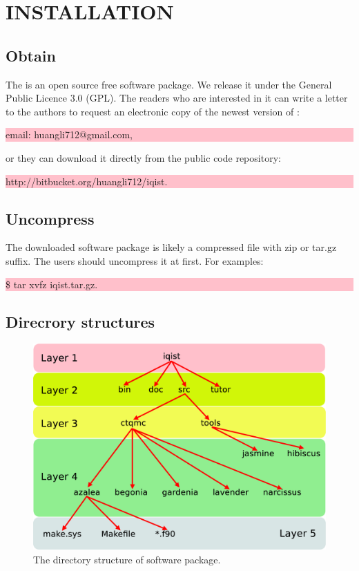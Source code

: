 \chapter{INSTALLATION}
\section{Obtain}

The {\iqist} is an open source free software package. We release it under the General Public Licence 3.0 (GPL). The readers who are interested in it can write a letter to the authors to request an electronic copy of the newest version of {\iqist}:
 
\noindent\colorbox{pink}{\parbox[r]{\linewidth}{\quad email: huangli712@gmail.com,}}
or they can download it directly from the public code repository:

\noindent\colorbox{pink}{\parbox[r]{\linewidth}{\quad http://bitbucket.org/huangli712/iqist.}}

\section{Uncompress}

The downloaded {\iqist} software package is likely a compressed file with zip or tar.gz suffix. The users should uncompress it at first. For examples:

\noindent\colorbox{pink}{\parbox[r]{\linewidth}{\quad \$ tar xvfz iqist.tar.gz.}}

\section{Direcrory structures}

\begin{figure}
\centering
\includegraphics[scale=0.28]{figure/dir.eps}
\caption{The directory structure of {\iqist} software package.\label{fig:dir}}
\end{figure}

